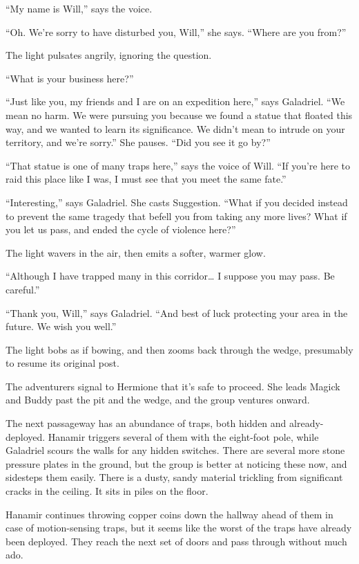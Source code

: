 \documentclass[smalldemyvopaper,11pt,twoside,onecolumn,openright,extrafontsizes]{memoir}
\begin{document}
``My name is Will,'' says the voice.

``Oh. We're sorry to have disturbed you, Will,'' she says. ``Where are
you from?''

The light pulsates angrily, ignoring the question.

``What is your business here?''

``Just like you, my friends and I are on an expedition here,'' says
Galadriel. ``We mean no harm. We were pursuing you because we found a
statue that floated this way, and we wanted to learn its significance.
We didn't mean to intrude on your territory, and we're sorry.'' She
pauses. ``Did you see it go by?''

``That statue is one of many traps here,'' says the voice of Will. ``If
you're here to raid this place like I was, I must see that you meet the
same fate.''

``Interesting,'' says Galadriel. She casts Suggestion. ``What if you
decided instead to prevent the same tragedy that befell you from taking
any more lives? What if you let us pass, and ended the cycle of violence
here?''

The light wavers in the air, then emits a softer, warmer glow.

``Although I have trapped many in this corridor\ldots{} I suppose you
may pass. Be careful.''

``Thank you, Will,'' says Galadriel. ``And best of luck protecting your
area in the future. We wish you well.''

The light bobs as if bowing, and then zooms back through the wedge,
presumably to resume its original post.

The adventurers signal to Hermione that it's safe to proceed. She leads
Magick and Buddy past the pit and the wedge, and the group ventures
onward.

The next passageway has an abundance of traps, both hidden and
already-deployed. Hanamir triggers several of them with the eight-foot
pole, while Galadriel scours the walls for any hidden switches. There
are several more stone pressure plates in the ground, but the group is
better at noticing these now, and sidesteps them easily. There is a
dusty, sandy material trickling from significant cracks in the ceiling.
It sits in piles on the floor.

Hanamir continues throwing copper coins down the hallway ahead of them
in case of motion-sensing traps, but it seems like the worst of the
traps have already been deployed. They reach the next set of doors and
pass through without much ado.
\end{document}

